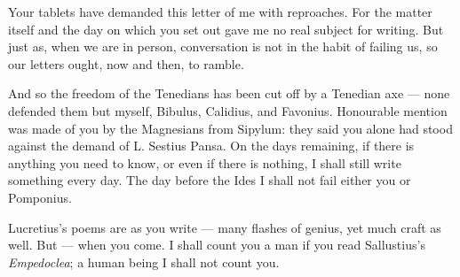

 Your tablets have demanded this letter of me with reproaches. For the matter itself and the day on which you set out gave me no real subject for writing. But just as, when we are in person, conversation is not in the habit of failing us, so our letters ought, now and then, to ramble.

 And so the freedom of the Tenedians has been cut off by a Tenedian axe — none defended them but myself, Bibulus, Calidius, and Favonius. Honourable mention was made of you by the Magnesians from Sipylum: they said you alone had stood against the demand of L. Sestius Pansa. On the days remaining, if there is anything you need to know, or even if there is nothing, I shall still write something every day. The day before the Ides I shall not fail either you or Pomponius.

 Lucretius's poems are as you write — many flashes of genius, yet much craft as well. But — when you come. I shall count you a man if you read Sallustius's \textit{Empedoclea}; a human being I shall not count you.
